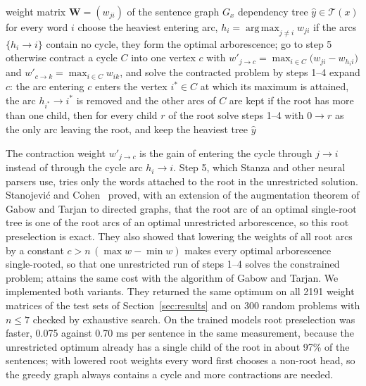 \documentclass[mathematics,article,submit,pdftex,oneauthor]{Definitions/mdpi}
\newcommand{\T}{\mathcal T}
\DeclareMathOperator*{\argmax}{arg\,max}
\begin{document}
\begin{Algorithm}\label{alg:cle}
\normalfont
\begin{algorithmic}[1]
\Require weight matrix $\mathbf W=(w_{ji})$ of the sentence graph $G_x$
\Ensure dependency tree $\hat y\in\T(x)$
\State for every word $i$ choose the heaviest entering arc, $h_i=\argmax_{j\neq i}w_{ji}$
\State if the arcs $\{h_i\to i\}$ contain no cycle, they form the optimal arborescence; go to step 5
\State otherwise contract a cycle $C$ into one vertex $c$ with $w'_{j\to c}=\max_{i\in C}\bigl(w_{ji}-w_{h_ii}\bigr)$ and $w'_{c\to k}=\max_{i\in C}w_{ik}$, and solve the contracted problem by steps 1--4
\State expand $c$: the arc entering $c$ enters the vertex $i^*\in C$ at which its maximum is attained, the arc $h_{i^*}\to i^*$ is removed and the other arcs of $C$ are kept
\State if the root has more than one child, then for every child $r$ of the root solve steps 1--4 with $0\to r$ as the only arc leaving the root, and keep the heaviest tree
\State \Return $\hat y$
\end{algorithmic}
\end{Algorithm}

The contraction weight $w'_{j\to c}$ is the gain of entering the cycle through $j\to i$ instead of through the cycle arc $h_i\to i$.
Step 5, which Stanza and other neural parsers use, tries only the words attached to the root in the unrestricted solution.
Stanojevi\'c and Cohen~\cite{Stanojevic2021} proved, with an extension of the augmentation theorem of Gabow and Tarjan to directed graphs, that the root arc of an optimal single-root tree is one of the root arcs of an optimal unrestricted arborescence, so this root preselection is exact.
They also showed that lowering the weights of all root arcs by a constant $c>n\,(\max w-\min w)$ makes every optimal arborescence single-rooted, so that one unrestricted run of steps 1--4 solves the constrained problem; \cite{Zmigrod2020} attains the same cost with the algorithm of Gabow and Tarjan.
We implemented both variants.
They returned the same optimum on all 2191 weight matrices of the test sets of Section~\ref{sec:results} and on 300 random problems with $n\leqslant7$ checked by exhaustive search.
On the trained models root preselection was faster, 0.075 against 0.70 ms per sentence in the same measurement, because the unrestricted optimum already has a single child of the root in about 97\% of the sentences; with lowered root weights every word first chooses a non-root head, so the greedy graph always contains a cycle and more contractions are needed.
\end{document}
